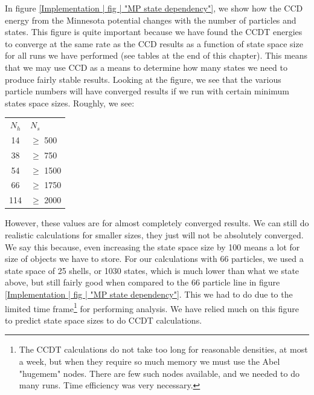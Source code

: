 \documentclass[10pt,twoside]{report}
\begin{document}
	In figure \ref{Implementation | fig | "MP state dependency"}, we show how the CCD energy from the Minnesota potential changes with the number of particles and states. This figure is quite important because we have found the CCDT energies to converge at the same rate as the CCD results as a function of state space size for all runs we have performed (see tables at the end of this chapter). This means that we may use CCD as a means to determine how many states we need to produce fairly stable results. Looking at the figure, we see that the various particle numbers will have converged results if we run with certain minimum states space sizes. Roughly, we see:
	
	\begin{center}
		\begin{tabular}{cl}
			$N_h$ & $N_s$ \\
			14 & $\geq$ 500 \\
			38 & $\geq$ 750 \\
			54 & $\geq$ 1500 \\
			66 & $\geq$ 1750 \\
			114 & $\geq$ 2000
		\end{tabular}
	\end{center}
	
	However, these values are for almost completely converged results. We can still do realistic calculations for smaller sizes, they just will not be absolutely converged. We say this because, even increasing the state space size by 100 means a lot for size of objects we have to store. For our calculations with 66 particles, we used a state space of 25 shells, or 1030 states, which is much lower than what we state above, but still fairly good when compared to the 66 particle line in figure \ref{Implementation | fig | "MP state dependency"}. This we had to do due to the limited time frame\footnote{The CCDT calculations do not take too long for reasonable densities, at most a week, but when they require so much memory we must use the Abel "hugemem" nodes. There are few such nodes available, and we needed to do many runs. Time efficiency was very necessary.} for performing analysis. We have relied much on this figure to predict state space sizes to do CCDT calculations.\\
	
\end{document}
